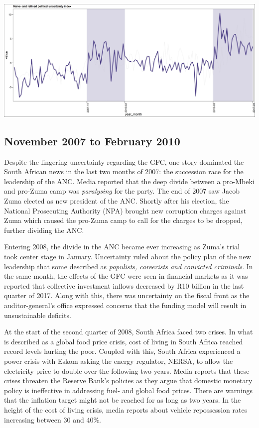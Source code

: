 \documentclass[11pt,preprint, authoryear]{elsarticle}
\let\origfigure\figure
\let\endorigfigure\endfigure
\renewenvironment{figure}[1][2] {
    \expandafter\origfigure\expandafter[H]
} {
    \endorigfigure
}
\numberwithin{equation}{section}
\numberwithin{figure}{section}
\numberwithin{table}{section}
\begin{document}
\begin{figure}
	\centering
	\includegraphics[width=\linewidth, keepaspectratio]{bin/pol_comps}\\
	\caption{Composite Political uncertainty refined index. \label{pol_comp_final}}
\end{figure}

\subsection{November 2007 to February
2010}\label{november-2007-to-february-2010}

Despite the lingering uncertainty regarding the GFC, one story dominated
the South African news in the last two months of 2007: the succession
race for the leadership of the ANC. Media reported that the deep divide
between a pro-Mbeki and pro-Zuma camp was \emph{paralysing} for the
party. The end of 2007 saw Jacob Zuma elected as new president of the
ANC. Shortly after his election, the National Prosecuting Authority
(NPA) brought new corruption charges against Zuma which caused the
pro-Zuma camp to call for the charges to be dropped, further dividing
the ANC.

Entering 2008, the divide in the ANC became ever increasing as Zuma's
trial took center stage in January. Uncertainty ruled about the policy
plan of the new leadership that some described as
\emph{populists, careerists and convicted criminals}. In the same month,
the effects of the GFC were seen in financial markets as it was reported
that collective investment inflows decreased by R10 billion in the last
quarter of 2017. Along with this, there was uncertainty on the fiscal
front as the auditor-general's office expressed concerns that the
funding model will result in unsustainable deficits.

At the start of the second quarter of 2008, South Africa faced two
crises. In what is described as a global food price crisis, cost of
living in South Africa reached record levels hurting the poor. Coupled
with this, South Africa experienced a power crisis with Eskom asking the
energy regulator, NERSA, to allow the electricity price to double over
the following two years. Media reports that these crises threaten the
Reserve Bank's policies as they argue that domestic monetary policy is
ineffective in addressing fuel- and global food prices. There are
warnings that the inflation target might not be reached for as long as
two years. In the height of the cost of living crisis, media reports
about vehicle repossession rates increasing between 30 and 40\%.
\end{document}
